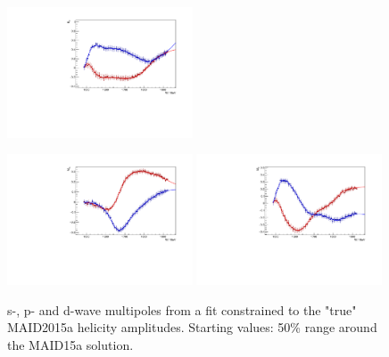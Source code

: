 \documentclass[a4paper,12pt]{report}
\begin{document}
\begin{figure}
\begin{center}
{    \includegraphics[width=0.49\textwidth]{MAID2015a/PenHeli_dat/plots.0/E2m.pdf}
    }
    \centerline{
    \includegraphics[width=0.49\textwidth]{MAID2015a/PenHeli_dat/plots.0/M2p.pdf}
    \includegraphics[width=0.49\textwidth]{MAID2015a/PenHeli_dat/plots.0/M2m.pdf}
    }
    \caption{s-, p- and d-wave multipoles from a fit constrained to the "true" MAID2015a helicity amplitudes. 
    Starting values: 50\% range around the MAID15a solution.}
\label{Fig:const1}
  \end{center}
\end{figure}
\end{document}
